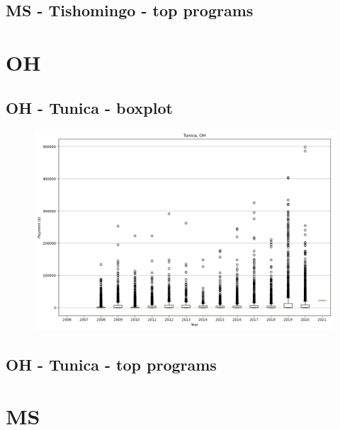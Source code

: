 \subsection*{MS - Tishomingo - top programs}

\newpage
\section*{OH}
\subsection*{OH - Tunica - boxplot}
\begin{figure}[h]
\centering
\includegraphics[width=7in]{../output/boxplots/counties/Tunica-OH_boxplot.png}
\end{figure}


\subsection*{OH - Tunica - top programs}

\newpage
\section*{MS}
